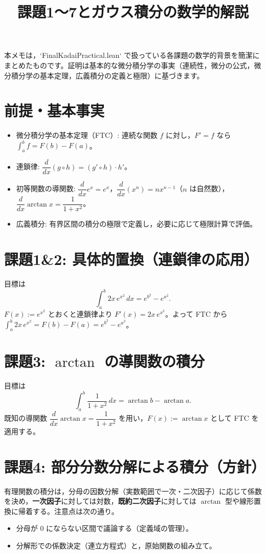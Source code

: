 \documentclass[a4paper,12pt]{article}
\title{課題1〜7とガウス積分の数学的解説}
\author{}
\date{}
\begin{document}
\maketitle

本メモは，`FinalKadaiPractical.lean` で扱っている各課題の数学的背景を簡潔にまとめたものです。証明は基本的な微分積分学の事実（連続性，微分の公式，微分積分学の基本定理，広義積分の定義と極限）に基づきます。

\section*{前提・基本事実}
\begin{itemize}
  \item 微分積分学の基本定理（FTC）: 連続な関数 $f$ に対し，$F' = f$ なら $\int_a^b f = F(b) - F(a)$。
  \item 連鎖律: $\dfrac{d}{dx}(g\circ h) = (g'\circ h)\cdot h'$。
  \item 初等関数の導関数: $\dfrac{d}{dx} e^{x} = e^{x}$，$\dfrac{d}{dx} (x^n) = n x^{n-1}$（$n$ は自然数），$\dfrac{d}{dx}\arctan x = \dfrac{1}{1+x^2}$。
  \item 広義積分: 有界区間の積分の極限で定義し，必要に応じて極限計算で評価。
\end{itemize}

\section{課題1\&2: 具体的置換（連鎖律の応用）}
目標は
\[
  \int_a^b 2x\, e^{x^2}\,dx = e^{b^2} - e^{a^2}.
\]
$F(x) := e^{x^2}$ とおくと連鎖律より $F'(x) = 2x\, e^{x^2}$。よって FTC から $\int_a^b 2x\, e^{x^2} = F(b) - F(a) = e^{b^2} - e^{a^2}$。

\section{課題3: $\arctan$ の導関数の積分}
目標は
\[
  \int_a^b \frac{1}{1+x^2}\,dx = \arctan b - \arctan a.
\]
既知の導関数 $\dfrac{d}{dx}\arctan x = \dfrac{1}{1+x^2}$ を用い，$F(x) := \arctan x$ として FTC を適用する。

\section{課題4: 部分分数分解による積分（方針）}
有理関数の積分は，分母の因数分解（実数範囲で一次・二次因子）に応じて係数を決め，\textbf{一次因子}に対しては対数，\textbf{既約二次因子}に対しては $\arctan$ 型や線形置換に帰着する。注意点は次の通り。
\begin{itemize}
  \item 分母が 0 にならない区間で議論する（定義域の管理）。
  \item 分解形での係数決定（連立方程式）と，原始関数の組み立て。
\end{itemize}
\end{document}
